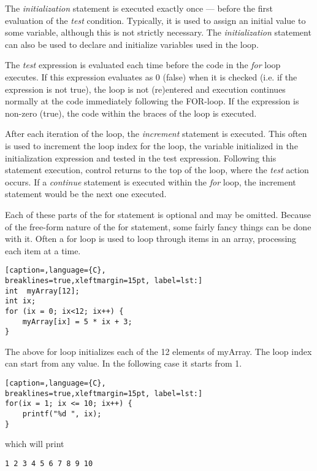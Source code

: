 The \emph{initialization} statement is executed exactly once --- before the
first evaluation of the \emph{test} condition. Typically, it is used to assign
an initial value to some variable, although this is not strictly necessary. The
\emph{initialization} statement can also be used to declare and initialize
variables used in the loop.

The \emph{test} expression is evaluated each time before the code in the
\emph{for} loop executes. If this expression evaluates as 0 (false) when it is
checked (i.e. if the expression is not true), the loop is not (re)entered and
execution continues normally at the code immediately following the FOR-loop. If
the expression is non-zero (true), the code within the braces of the loop is
executed. 

After each iteration of the loop, the \emph{increment} statement is executed.
This often is used to increment the loop index for the loop, the variable
initialized in the initialization expression and tested in the test expression.
Following this statement execution, control returns to the top of the loop,
where the \emph{test} action occurs. If a \emph{continue} statement is executed
within the \emph{for} loop, the increment statement would be the next one
executed. 

Each of these parts of the for statement is optional and may be omitted.
Because of the free-form nature of the for statement, some fairly fancy things
can be done with it. Often a for loop is used to loop through items in an
array, processing each item at a time. 
\lstset{basicstyle=\scriptsize, numbers=left, captionpos=b, tabsize=4}
\begin{lstlisting}[caption=,language={C},
breaklines=true,xleftmargin=15pt, label=lst:]
int  myArray[12];
int ix;
for (ix = 0; ix<12; ix++) {
	myArray[ix] = 5 * ix + 3;
}
\end{lstlisting}

The above for loop initializes each of the 12 elements of myArray.  The loop
index can start from any value. In the following case it starts from 1.
\lstset{basicstyle=\scriptsize, numbers=left, captionpos=b, tabsize=4}
\begin{lstlisting}[caption=,language={C},
breaklines=true,xleftmargin=15pt, label=lst:]
for(ix = 1; ix <= 10; ix++) {
	printf("%d ", ix);
}
\end{lstlisting}

which will print
\scriptsize
\begin{verbatim}
1 2 3 4 5 6 7 8 9 10 
\end{verbatim}
\normalsize

